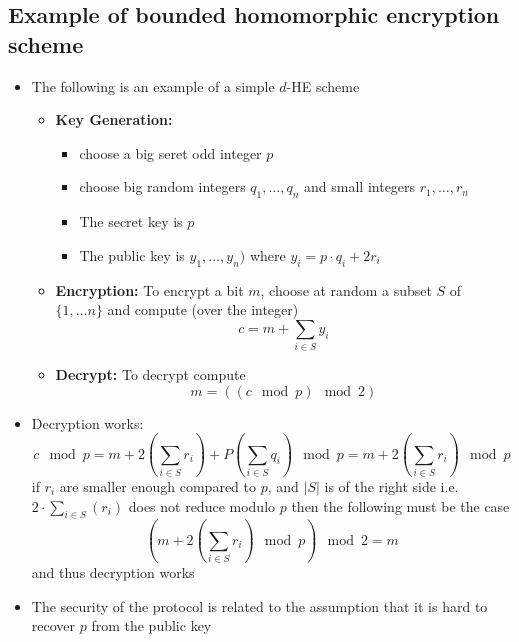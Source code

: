 \subsection{Example of bounded homomorphic encryption scheme}%
\begin{itemize}
    \item The following is an example of a simple $d$-HE scheme
    \begin{itemize}
        \item \textbf{Key Generation:}
        \begin{itemize}
            \item choose a big seret odd integer $p$
            \item choose big random integers $q_1, \dots, q_n$ and small integers $r_1, \dots, r_n$
            \item The secret key is $p$
            \item The public key is $y_1, \dots, y_n)$ where $y_i = p \cdot q_i + 2r_i$
        \end{itemize}
        \item \textbf{Encryption:} To encrypt a bit $m$, choose at random a subset $S$ of $\{1, \dots n\}$ and compute (over the integer)
        \begin{equation*}
            c = m + \sum_{i \in S} y_i
        \end{equation*}
        \item \textbf{Decrypt:} To decrypt compute
        \begin{equation*}
            m = ((c \mod p) \mod 2)
        \end{equation*}
    \end{itemize}
    \item Decryption works:
    \begin{equation*}
        c \mod p = m + 2 \left(\sum_{i \in S} r_i \right) + P \left(\sum_{i \in S} q_i \right) \mod p = m + 2 \left(\sum_{i \in S} r_i \right) \mod p
    \end{equation*}
    if $r_i$ are smaller enough compared to $p$, and $|S|$ is of the right side i.e. $2 \cdot \sum_{i \in S}(r_i)$ does not reduce modulo $p$ then the following must be the case
    \begin{equation*}
        (m + 2 \left(\sum_{i \in S} r_i \right) \mod p) \mod 2 = m
    \end{equation*}
    and thus decryption works
    \item The security of the protocol is related to the assumption that it is hard to recover $p$ from the public key

\end{itemize}
